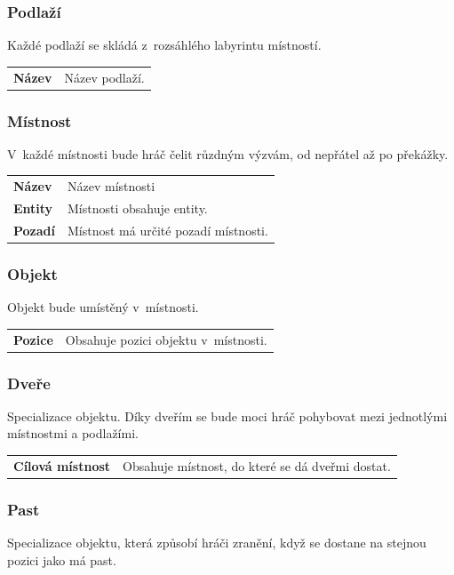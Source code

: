 \documentclass[12pt,a4paper]{article}
\begin{document}
\subsubsection{Podlaží}
Každé podlaží se skládá z~rozsáhlého labyrintu místností. \\[5pt]

\begin{tabular*}{0.4\textwidth}{ll}
  \bf Název & Název podlaží.\\[7pt]
\end{tabular*}

\subsubsection{Místnost}
V~každé místnosti bude hráč čelit růzdným výzvám, od nepřátel až po
překážky.\\[5pt]

\begin{tabular*}{0.55\textwidth}{ll}
  \bf Název & Název místnosti \\[7pt]
  \bf Entity & Místnosti obsahuje entity. \\[7pt]
  \bf Pozadí & Místnost má určité pozadí místnosti.\\[7pt]
\end{tabular*}

\subsubsection{Objekt}
Objekt bude umístěný v~místnosti.\\[5pt]
\begin{tabular*}{0.55\textwidth}{ll}
  \bf Pozice & Obsahuje pozici objektu v~místnosti.\\[7pt]
\end{tabular*}

\subsubsection{Dveře}
Specializace objektu. Díky dveřím se bude moci hráč pohybovat mezi jednotlými
místnostmi a podlažími.\\[5pt]
\begin{tabular*}{0.87\textwidth}{ll}
  \bf Cílová místnost & Obsahuje místnost, do které se dá dveřmi dostat.
\end{tabular*}

\subsubsection{Past}
Specializace objektu, která způsobí hráči zranění, když se dostane na stejnou
pozici jako má past.\\[5pt]
\end{document}
